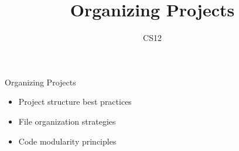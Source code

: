 \documentclass{beamer}
\title{Organizing Projects}
\author{CS12}
\date{}
\begin{document}
\begin{frame}
    \titlepage
\end{frame}

\begin{frame}{Organizing Projects}
    \begin{itemize}
        \item Project structure best practices
        \item File organization strategies
        \item Code modularity principles
    \end{itemize}
\end{frame}
\end{document}
